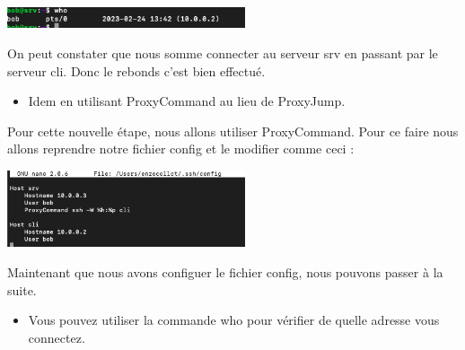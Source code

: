 \documentclass[12pt]{article}
\begin{document}
\vspace{0.3cm}

\begin{center}
  \includegraphics[width=7cm]{Image-TD-SSH-8/commande-who.png}
\end{center}

\vspace{0.3cm}

On peut constater que nous somme connecter au serveur srv en passant par le serveur cli. Donc le rebonds c'est bien effectué.

\vspace{0.3cm}

\begin{itemize}
  \item Idem en utilisant ProxyCommand au lieu de ProxyJump.
\end{itemize}

\vspace{0.3cm}

Pour cette nouvelle étape, nous allons utiliser ProxyCommand. Pour ce faire nous allons reprendre notre fichier config et le modifier comme ceci : 

\vspace{0.3cm}

\begin{center}
  \includegraphics[width=7cm]{Image-TD-SSH-8/ProxyCommand.png}
\end{center}

\vspace{0.3cm}

Maintenant que nous avons configuer le fichier config, nous pouvons passer à la suite.

\vspace{0.3cm}

\begin{itemize}
  \item Vous pouvez utiliser la commande who pour vérifier de quelle adresse vous connectez.
\end{itemize}

\vspace{0.3cm}
\end{document}
